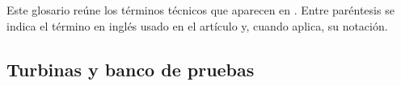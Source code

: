

Este glosario reúne los términos técnicos que aparecen en \citet{Lakdawala2025}. Entre paréntesis se indica el término en inglés usado en el artículo y, cuando aplica, su notación.

\subsection*{Turbinas y banco de pruebas}

